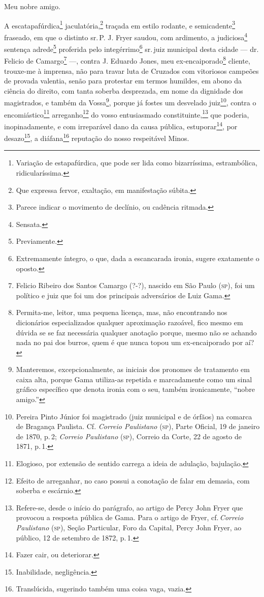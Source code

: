 Meu nobre amigo.

A escatapafúrdica\footnote{ Variação de estapafúrdica, que pode ser
  lida como bizarríssima, estrambólica, ridicularíssima.}
jaculatória,\footnote{ Que expressa fervor, exaltação, em manifestação
  súbita.} traçada em estilo rodante, e semicadente\footnote{ Parece
  indicar o movimento de declínio, ou cadência ritmada.} fraseado, em
que o distinto sr.\,P. J. Fryer saudou, com ardimento, a
judiciosa\footnote{ Sensata.} sentença adrede\footnote{ Previamente.}
proferida pelo integérrimo\footnote{ Extremamente íntegro, o que, dada
  a escancarada ironia, sugere exatamente o oposto.} sr.\,juiz municipal
desta cidade --- dr.\,Felicio de Camargo\footnote{ Felicio Ribeiro dos
  Santos Camargo (?-?), nascido em São Paulo (\textsc{sp}), foi um político e
  juiz que foi um dos principais adversários de Luiz Gama.} ---, contra
J. Eduardo Jones, meu ex-encaiporado\footnote{ Permita-me, leitor, uma
  pequena licença, mas, não encontrando nos dicionários especializados
  qualquer aproximação razoável, fico mesmo em dúvida se se faz
  necessária qualquer anotação porque, mesmo não se achando nada no pai
  dos burros, quem é que nunca topou um ex-encaiporado por aí?} cliente,
trouxe-me à imprensa, não para travar luta de Cruzados com vitoriosos
campeões de provada valentia, senão para protestar em termos humildes,
em abono da ciência do direito, com tanta soberba desprezada, em nome da
dignidade dos magistrados, e também da Vossa\footnote{ Manteremos,
  excepcionalmente, as iniciais dos pronomes de tratamento em caixa
  alta, porque Gama utiliza-as repetida e marcadamente como um sinal
  gráfico específico que denota ironia com o seu, também ironicamente,
  ``nobre amigo.''}, porque já fostes um desvelado juiz\footnote{ Pereira
  Pinto Júnior foi magistrado (juiz municipal e de órfãos) na comarca de
  Bragança Paulista. Cf. \emph{Correio Paulistano} (\textsc{sp}), Parte Oficial,
  19 de janeiro de 1870, p.\,2; \emph{Correio Paulistano} (\textsc{sp}), Correio da Corte,
  22 de agosto de 1871, p.\,1.}, contra o encomiástico\footnote{ Elogioso, por
  extensão de sentido carrega a ideia de adulação, bajulação.}
arreganho\footnote{ Efeito de arreganhar, no caso possui a conotação de
  falar em demasia, com soberba e escárnio.} do vosso entusiasmado
constituinte,\footnote{ Refere-se, desde o início do parágrafo, ao
  artigo de Percy John Fryer que provocou a resposta pública de Gama.
  Para o artigo de Fryer, cf.\,\emph{Correio Paulistano} (\textsc{sp}), Seção
  Particular, Foro da Capital, Percy John Fryer, ao público, 12 de setembro de 1872,
  p.\,1.} que poderia, inopinadamente, e com irreparável dano da causa
pública, estuporar\footnote{ Fazer cair, ou deteriorar.}, por
desazo\footnote{ Inabilidade, negligência.}, a diáfana\footnote{
  Translúcida, sugerindo também uma coisa vaga, vazia.} reputação do
nosso respeitável Minos.

